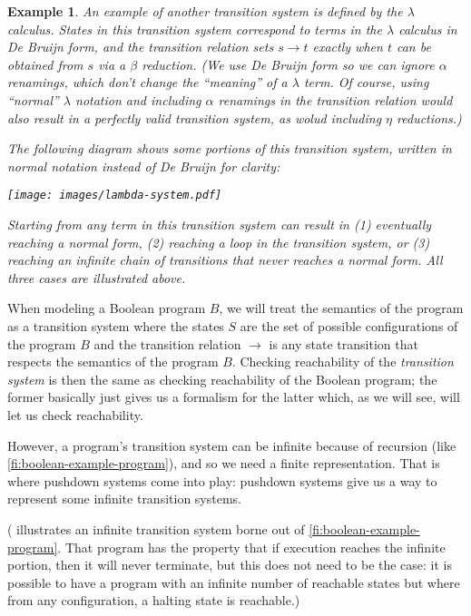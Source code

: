 \documentclass{article}
\newtheorem{example}{Example}
\begin{document}
\begin{example}
An example of another transition system is defined by the $\lambda$
calculus. States in this transition system correspond to terms in the
$\lambda$ calculus in De Bruijn form, and the transition relation sets
$s \rightarrow t$ exactly when $t$ can be obtained from $s$ via a
$\beta$ reduction. (We use De Bruijn form so we can ignore $\alpha$
renamings, which don't change the ``meaning'' of a $\lambda$ term. Of
course, using ``normal'' $\lambda$ notation and including $\alpha$
renamings in the transition relation would also result in a perfectly
valid transition system, as wolud including $\eta$ reductions.)

The following diagram shows some portions of this transition system,
written in normal notation instead of De Bruijn for clarity:\\
\begin{center}
  \texttt{[image: images/lambda-system.pdf]}
\end{center}

Starting from any term in this transition system can result in (1)
eventually reaching a normal form, (2) reaching a loop in the
transition system, or (3) reaching an infinite chain of transitions
that never reaches a normal form. All three cases are illustrated
above.
\end{example}

When modeling a Boolean program $B$, we will treat the semantics of
the program as a transition system where the states $S$ are the set of
possible configurations of the program $B$ and the transition relation
$\rightarrow$ is any state transition that respects the semantics of
the program $B$. Checking reachability of the \emph{transition system}
is then the same as checking reachability of the Boolean program; the
former basically just gives us a formalism for the latter which, as we
will see, will let us check reachability.

However, a program's transition system can be infinite because of
recursion (like \cref{fi:boolean-example-program}), and so we need a
finite representation. That is where pushdown systems come into play:
pushdown systems give us a way to represent some infinite transition
systems.

( illustrates an infinite transition
system borne out of \cref{fi:boolean-example-program}. That program
has the property that if execution reaches the infinite portion, then
it will never terminate, but this does not need to be the case: it is
possible to have a program with an infinite number of reachable states
but where from any configuration, a halting state is reachable.)
\end{document}
